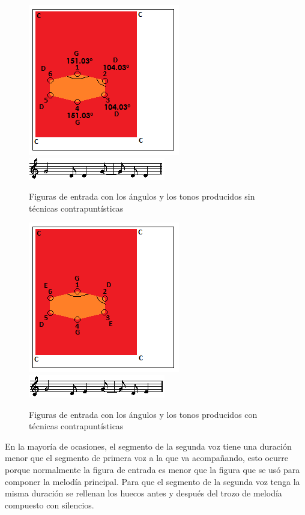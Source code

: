 		\begin{figure}[htbp]
		\centering
		\hspace*{0.0in}
		\includegraphics[scale=1]{graphics/simpletest4-F3.png}
		\includegraphics[scale=1]{graphics/simpletest4-F3-MEL2partitura.png}
		\caption{Figuras de entrada con los ángulos y los tonos producidos sin técnicas contrapuntísticas}
		\label{fig:Figura3Voz2}
		\end{figure}

		\begin{figure}[htbp]
		\centering
		\hspace*{0.0in}
		\includegraphics[scale=1]{graphics/simpletest4-F3_2.png}
		\includegraphics[scale=1]{graphics/simpletest4-F3_2-MEL2partitura.png}
		\caption{Figuras de entrada con los ángulos y los tonos producidos con técnicas contrapuntísticas}
		\label{fig:Figura4Voz2}
		\end{figure}

En la mayoría de ocasiones, el segmento de la segunda voz tiene una duración menor que el segmento de primera voz a la que va acompañando, esto ocurre porque normalmente la figura de entrada es menor que la figura que se usó para componer la melodía principal. Para que el segmento de la segunda voz tenga la misma duración se rellenan los huecos antes y después del trozo de melodía compuesto con silencios.

